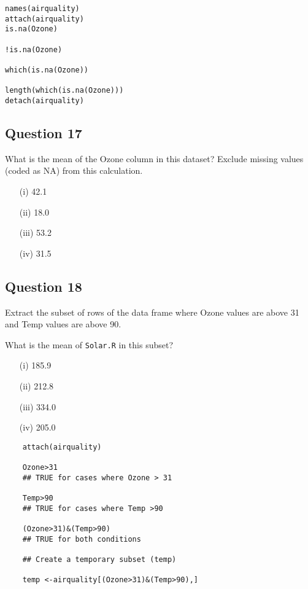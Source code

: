 \documentclass[12pt]{article}
\begin{document}
\begin{framed}
\begin{verbatim}
names(airquality)
attach(airquality)
is.na(Ozone)

!is.na(Ozone)

which(is.na(Ozone))

length(which(is.na(Ozone)))
detach(airquality)
\end{verbatim}
\end{framed}
\newpage
\subsection*{Question 17}
\Large
What is the mean of the Ozone column in this dataset? Exclude missing values (coded as NA) from this calculation.

\begin{itemize}
	\item[(i)] 42.1
	\item[(ii)] 18.0
	\item[(iii)] 53.2
	\item[(iv)] 31.5
\end{itemize}



\subsection*{Question 18}
\Large
Extract the subset of rows of the data frame where Ozone values are above 31 and Temp values are above 90. 

What is the mean of \texttt{Solar.R} in this subset?

\begin{itemize}
	\item[(i)] 185.9
	\item[(ii)] 212.8
	\item[(iii)] 334.0
	\item[(iv)] 205.0
\end{itemize}

\begin{framed}
	\begin{verbatim}
	attach(airquality)
	
	Ozone>31
	## TRUE for cases where Ozone > 31
	
	Temp>90
	## TRUE for cases where Temp >90
	
	(Ozone>31)&(Temp>90)
	## TRUE for both conditions
	
	## Create a temporary subset (temp)
	
	temp <-airquality[(Ozone>31)&(Temp>90),]


    	
	\end{verbatim}
\end{framed}
\newpage
\end{document}
